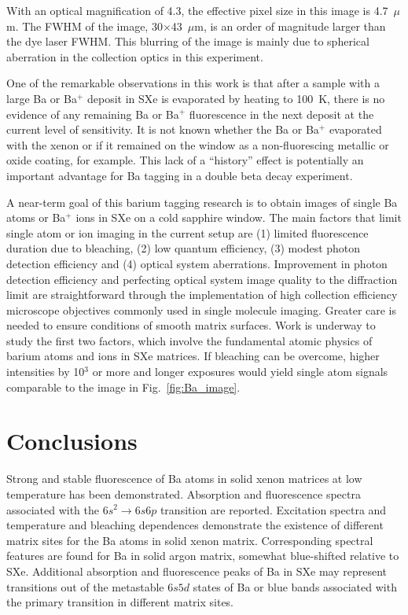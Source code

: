 \documentclass[aps,pra,reprint,superscriptaddress]{revtex4-1}
\begin{document}
With an optical magnification of 4.3, the effective pixel size in this image is 4.7~$\mu$m.
The FWHM of the image, 30$\times$43~$\mu$m, is an order of magnitude larger than the dye laser FWHM.
This blurring of the image is mainly due to spherical aberration in the collection optics in this experiment.

One of the remarkable observations in this work is that after a sample with a large Ba or Ba$^+$ deposit in SXe is evaporated by heating to 100~K, there is no evidence of any remaining Ba or Ba$^+$ fluorescence in the next deposit at the current level of sensitivity.
It is not known whether the  Ba or Ba$^+$ evaporated with the xenon or if it remained on the window as a non-fluorescing metallic or oxide coating, for example.
This lack of a ``history'' effect is potentially an important advantage for Ba tagging in a double beta decay experiment.

A near-term goal of this barium tagging research is to obtain images of single Ba atoms or Ba$^+$ ions in SXe on a cold sapphire window.
The main factors that limit single atom or ion imaging in the current setup are (1) limited fluorescence duration due to bleaching, (2) low quantum efficiency, (3) modest photon detection efficiency and (4) optical system aberrations.
Improvement in photon detection efficiency and perfecting optical system image quality to the diffraction limit are straightforward through the implementation of high collection efficiency microscope objectives commonly used in single molecule imaging.
Greater care is needed to ensure conditions of smooth matrix surfaces.
Work is underway to study the first two factors, which involve the fundamental atomic physics of barium atoms and ions in SXe matrices.
If bleaching can be overcome, higher intensities by 10$^3$ or more and longer exposures would yield single atom signals comparable to the image in Fig.~\ref{fig:Ba_image}.

\section{Conclusions}

Strong and stable fluorescence of Ba atoms in solid xenon matrices at low temperature has been demonstrated.
Absorption and fluorescence spectra associated with the $6s^2 \!\! \rightarrow \!\! 6s6p$ transition are reported.
Excitation spectra and temperature and bleaching dependences demonstrate the existence of different matrix sites for the Ba atoms in solid xenon matrix.
Corresponding spectral features are found for Ba in solid argon matrix, somewhat blue-shifted relative to SXe.
Additional absorption and fluorescence peaks of Ba in SXe may represent transitions out of the metastable $6s5d$ states of Ba or blue bands associated with the primary transition in different matrix sites.
\end{document}
